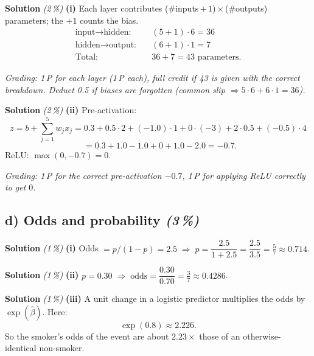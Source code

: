\documentclass[11pt,a4paper]{article}
\newcommand{\subpoints}[1]{\textit{(#1\,\%)}}
\newcommand{\sol}{\noindent\textbf{Solution}}
\begin{document}
\sol{} \subpoints{2} \textbf{(i)} Each layer contributes (\#inputs\,$+\,1$)\,$\times$\,(\#outputs)
parameters; the $+1$ counts the bias.
\begin{align*}
\text{input}\to\text{hidden:} & \quad (5+1)\cdot 6 = 36 \\
\text{hidden}\to\text{output:} & \quad (6+1)\cdot 1 = 7 \\
\text{Total:} & \quad \boxed{36 + 7 = 43} \text{ parameters.}
\end{align*}

\noindent\emph{Grading: 1\,P for each layer (1\,P each), full credit if 43 is given with the correct
breakdown. Deduct 0.5 if biases are forgotten (common slip $\Rightarrow 5\cdot 6 + 6\cdot 1 = 36$).}

\medskip
\sol{} \subpoints{2} \textbf{(ii)} Pre-activation:
$$z = b + \sum_{j=1}^5 w_j x_j
   = 0.3 + 0.5\cdot 2 + (-1.0)\cdot 1 + 0\cdot(-3) + 2\cdot 0.5 + (-0.5)\cdot 4$$
$$\phantom{z} = 0.3 + 1.0 - 1.0 + 0 + 1.0 - 2.0 = -0.7.$$
ReLU: $\max(0, -0.7) = \boxed{0}$.

\noindent\emph{Grading: 1\,P for the correct pre-activation $-0.7$, 1\,P for applying ReLU
correctly to get $0$.}

\subsection*{d) Odds and probability \subpoints{3}}

\sol{} \subpoints{1} \textbf{(i)} Odds $=p/(1-p)=2.5\;\Rightarrow\;p=\dfrac{2.5}{1+2.5}=\dfrac{2.5}{3.5}=\boxed{\tfrac{5}{7}\approx 0.714}$.

\medskip
\sol{} \subpoints{1} \textbf{(ii)} $p=0.30\;\Rightarrow\;\text{odds}=\dfrac{0.30}{0.70}=\boxed{\tfrac{3}{7}\approx 0.4286}$.

\medskip
\sol{} \subpoints{1} \textbf{(iii)} A unit change in a logistic predictor multiplies the odds by
$\exp(\hat\beta)$. Here:
$$\exp(0.8) \approx \boxed{2.226}.$$
So the smoker's odds of the event are about $2.23\times$ those of an otherwise-identical non-smoker.
\end{document}
